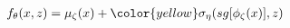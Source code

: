 \documentclass[preview]{standalone}
\begin{document}
\begin{align*}
f_\theta (x,z) =  \mu_{\zeta}(x) + \color{yellow} \sigma_{\eta}(sg[\phi_\zeta (x)],z)
\end{align*}
\end{document}
